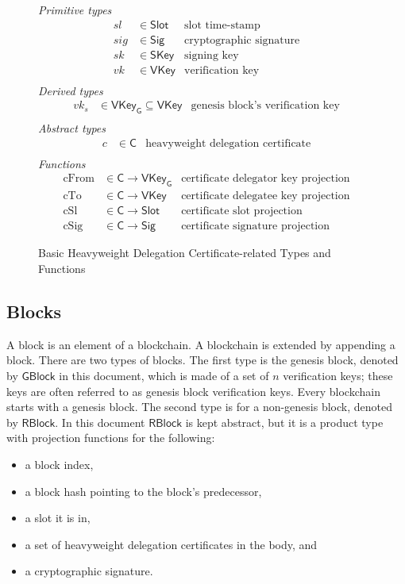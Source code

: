 \documentclass[11pt,a4paper]{article}
\newcommand{\type}[1]{\mathsf{#1}}
\newcommand{\Slot}{\type{Slot}}
\newcommand{\GBlock}{\type{GBlock}}
\newcommand{\RBlock}{\type{RBlock}}
\newcommand{\HCert}{\type{C}}
\newcommand{\SKey}{\type{SKey}}
\newcommand{\VKey}{\type{VKey}}
\newcommand{\VKeyGen}{\type{VKey_G}}
\newcommand{\Sig}{\type{Sig}}
\newcommand{\totalf}{\to}
\begin{document}
\begin{figure}
  \emph{Primitive types}
  \begin{align*}
    sl & \in \Slot    & \text{slot time-stamp}\\
   sig & \in \Sig     & \text{cryptographic signature}\\
    sk & \in \SKey    & \text{signing key}\\
    vk & \in \VKey    & \text{verification key}\\
  \end{align*}
  \emph{Derived types}
  \begin{align*}
    vk_s & \in \VKeyGen \subseteq \VKey & \text{genesis block's verification key}\\
  \end{align*}
  \emph{Abstract types}
  \begin{align*}
    c & \in \HCert  & \text{heavyweight delegation certificate} \\
  \end{align*}
  \emph{Functions}
  \begin{align*}
    \text{cFrom} & \in \HCert \totalf \VKeyGen & \text{certificate delegator key projection} \\
    \text{cTo} & \in \HCert \totalf \VKey & \text{certificate delegatee key projection} \\
    \text{cSl} & \in \HCert \totalf \Slot & \text{certificate slot projection} \\
    \text{cSig} & \in \HCert \totalf \Sig & \text{certificate signature projection}
  \end{align*}
  \caption{Basic Heavyweight Delegation Certificate-related Types and Functions}
  \label{fig:cert-defs}
\end{figure}


\subsection{Blocks}
\label{sec:blocks}

A block is an element of a blockchain.
%
A blockchain is extended by appending a block.
%
There are two types of blocks.
%
The first type is the genesis block, denoted by $\GBlock$ in this document,
which is made of a set of $n$ verification keys;
%
these keys are often referred to as genesis block verification keys.
%
Every blockchain starts with a genesis block.
%
The second type is for a non-genesis block, denoted by $\RBlock$.
%
In this document $\RBlock$ is kept abstract, but it is a product type with
projection functions for the following:
%
\begin{itemize}
\item a block index,
\item a block hash pointing to the block's predecessor,
\item a slot it is in,
\item a set of heavyweight delegation certificates in the body, and
\item a cryptographic signature.
\end{itemize}
\end{document}
